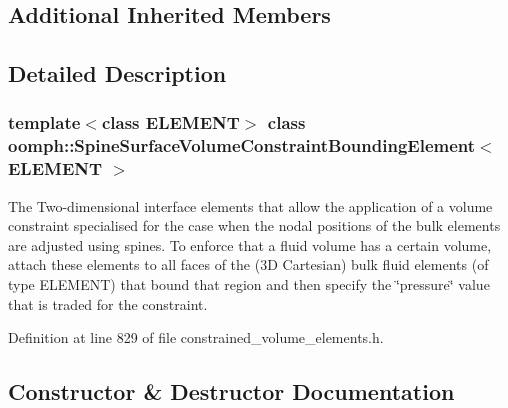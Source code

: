 \subsection*{Additional Inherited Members}


\subsection{Detailed Description}
\subsubsection*{template$<$class E\+L\+E\+M\+E\+NT$>$\newline
class oomph\+::\+Spine\+Surface\+Volume\+Constraint\+Bounding\+Element$<$ E\+L\+E\+M\+E\+N\+T $>$}

The Two-\/dimensional interface elements that allow the application of a volume constraint specialised for the case when the nodal positions of the bulk elements are adjusted using spines. To enforce that a fluid volume has a certain volume, attach these elements to all faces of the (3D Cartesian) bulk fluid elements (of type E\+L\+E\+M\+E\+NT) that bound that region and then specify the \char`\"{}pressure\char`\"{} value that is traded for the constraint. 

Definition at line 829 of file constrained\+\_\+volume\+\_\+elements.\+h.



\subsection{Constructor \& Destructor Documentation}
\mbox{\label{classoomph_1_1SpineSurfaceVolumeConstraintBoundingElement_a1426f4750d43008e7c33526cf01f23f3}} 
